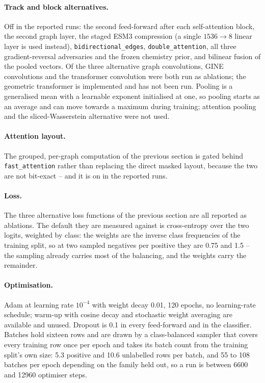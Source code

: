 \paragraph{Track and block alternatives.} Off in the reported runs: the second
feed-forward after each self-attention block, the second graph layer, the staged ESM3
compression (a single $1536 \to 8$ linear layer is used instead), \texttt{bidirectional\_edges},
\texttt{double\_attention}, all three gradient-reversal adversaries and the frozen
chemistry prior, and bilinear fusion of the pooled vectors. Of the three alternative
graph convolutions, GINE convolutions and the transformer convolution were both run as
ablations; the geometric transformer is implemented and has not been run. Pooling is a
generalised mean with a learnable exponent initialised at one, so pooling starts as an
average and can move towards a maximum during training; attention pooling and the
sliced-Wasserstein alternative were not used.

\paragraph{Attention layout.} The grouped, per-graph computation of the previous section
is gated behind \texttt{fast\_attention} rather than replacing the direct masked layout,
because the two are not bit-exact -- and it is on in the reported runs.

\paragraph{Loss.} The three alternative loss functions of the previous section are all
reported as ablations. The default they are measured against is cross-entropy over the
two logits, weighted by class: the weights are the inverse class frequencies of the
training split, so at two sampled negatives per positive they are 0.75 and 1.5 -- the
sampling already carries most of the balancing, and the weights carry the remainder.

\paragraph{Optimisation.} Adam \cite{adam} at learning rate $10^{-4}$ with weight decay
0.01, 120 epochs, no learning-rate schedule; warm-up with cosine decay and stochastic
weight averaging are available and unused. Dropout is 0.1 in every feed-forward and in the
classifier. Batches hold sixteen rows and are drawn by a class-balanced sampler that
covers every training row once per epoch and takes its batch count from the training
split's own size: 5.3 positive and 10.6 unlabelled rows per batch, and 55 to 108 batches
per epoch depending on the family held out, so a run is between 6600 and 12960 optimiser
steps.

